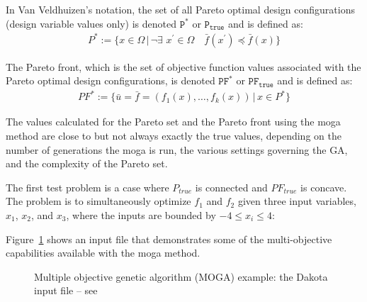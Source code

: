 In Van Veldhuizen's notation, the set of all Pareto optimal design
configurations (design variable values only) is denoted $\mathtt{P^*}$
or $\mathtt{P_{true}}$ and is defined as:
\begin{eqnarray*}
  P^*:=\{x\in\Omega\,|\,\neg\exists\,\,
  x^\prime\in\Omega\quad\bar{f}(x^\prime)\preceq\bar{f}(x)\}
\end{eqnarray*}
 
The Pareto front, which is the set of objective function values
associated with the Pareto optimal design configurations, is denoted
$\mathtt{PF^*}$ or $\mathtt{PF_{true}}$ and is defined as:
\begin{eqnarray*}
  PF^*:=\{\bar{u}=\bar{f}=(f_1(x),\ldots,f_k(x))\,|\, x\in P^*\}
\end{eqnarray*}
 
The values calculated for the Pareto set and the Pareto front using
the moga method are close to but not always exactly the true values,
depending on the number of generations the moga is run, the various
settings governing the GA, and the complexity of the Pareto set.
 
The first test problem is a case where $P_{true}$ is connected and
$PF_{true}$ is concave. The problem is to simultaneously optimize
$f_1$ and $f_2$ given three input variables, $x_1$, $x_2$, and $x_3$,
where the inputs are bounded by $-4 \leq x_{i} \leq 4$:
 
Figure~\ref{opt:additional:multiobjective:example2:moga1inp} shows an
input file that demonstrates some of the multi-objective capabilities
available with the moga method.
\begin{figure}[htp!]
  \centering
  \begin{bigbox}
    \begin{small}
    \end{small}
  \end{bigbox}
  \caption{Multiple objective genetic algorithm (MOGA) example: the
    Dakota input file --
see \protect{} }
  \label{opt:additional:multiobjective:example2:moga1inp}
\end{figure}
 
